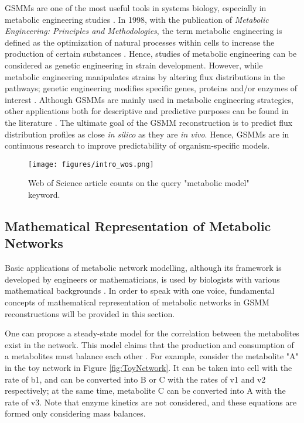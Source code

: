 GSMMs are one of the most useful tools in systems biology, especially in metabolic engineering studies \cite{kim2012recent}. In 1998, with the publication of \emph{Metabolic Engineering: Principles and Methodologies}, the term metabolic engineering is defined as the optimization of natural processes within cells to increase the production of certain substances \cite{stephanopoulos1999metabolic}. Hence, studies of metabolic engineering can be considered as genetic engineering in strain development. However, while metabolic engineering manipulates strains by altering flux distributions in the pathways; genetic engineering modifies specific genes, proteins and/or enzymes of interest \cite{stephanopoulos2012synthetic}. Although GSMMs are mainly used in metabolic engineering strategies, other applications both for descriptive and predictive purposes can be found in the literature \cite{osterlund2012fifteen}. The ultimate goal of the GSMM reconstruction is to predict flux distribution profiles as close \emph{in silico} as they are \emph{in vivo}. Hence, GSMMs are in continuous research to improve predictability of organism-specific models.

\begin{figure}[H]
\begin{center}
\texttt{[image: figures/intro\_wos.png]}
\end{center}
\caption[Web of Science article counts on the query "metabolic model" keyword]{Web of Science article counts on the query "metabolic model" keyword.}
\label{fig:wos_metabolicmodel}
\end{figure}

\subsection{Mathematical Representation of Metabolic Networks}
Basic applications of metabolic network modelling, although its framework is developed by engineers or mathematicians, is used by biologists with various mathematical backgrounds \cite{pinzon2018mathematical}. In order to speak with one voice, fundamental concepts of mathematical representation of metabolic networks in GSMM reconstructions will be provided in this section.

One can propose a steady-state model for the correlation between the metabolites exist in the network. This model claims that the production and consumption of a metabolites must balance each other \cite{reimers2016steady}. For example, consider the metabolite "A" in the toy network in Figure \ref{fig:ToyNetwork}. It can be taken into cell with the rate of b1, and can be converted into B or C with the rates of v1 and v2 respectively; at the same time, metabolite C can be converted into A with the rate of v3. Note that enzyme kinetics are not considered, and these equations are formed only considering mass balances.

